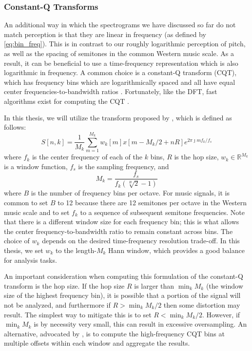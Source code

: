 \subsubsection{Constant-Q Transforms}
\label{sec:cqt}

An additional way in which the spectrograms we have discussed so far do not match perception is that they are linear in frequency (as defined by \cref{eq:bin_freq}).
This is in contrast to our roughly logarithmic perception of pitch, as well as the spacing of semitones in the common Western music scale.
As a result, it can be beneficial to use a time-frequency representation which is also logarithmic in frequency.
A common choice is a constant-Q transform (CQT), which has frequency bins which are logarithmically spaced and all have equal center frequencies-to-bandwidth ratios \cite{brown1991calculation}.
Fortunately, like the DFT, fast algorithms exist for computing the CQT \cite{brown1992efficient,schorkhuber2010constant}.

In this thesis, we will utilize the transform proposed by \cite{schorkhuber2010constant}, which is defined as follows:
\begin{equation}
        S[n, k] = \frac{1}{M_k} \sum_{m = 1}^{M_k} w_k[m]x[m - M_k/2 + nR] e^{2\pi \jmath m f_k/f_s}
\end{equation}
where $f_k$ is the center frequency of each of the $k$ bins, $R$ is the hop size, $w_k \in \mathbb{R}^{M_k}$ is a window function, $f_s$ is the sampling frequency, and
\begin{equation}
        M_k = \frac{f_s}{f_k (\sqrt[B]{2} - 1)}
\end{equation}
where $B$ is the number of frequency bins per octave.
For music signals, it is common to set $B$ to 12 because there are 12 semitones per octave in the Western music scale and to set $f_k$ to a sequence of subsequent semitone frequencies.
Note that there is a different window size for each frequency bin; this is what allows the center frequency-to-bandwidth ratio to remain constant across bins.
The choice of $w_k$ depends on the desired time-frequency resolution trade-off.
In this thesis, we set $w_k$ to the length-$M_k$ Hann window, which provides a good balance for analysis tasks.

An important consideration when computing this formulation of the constant-Q transform is the hop size.
If the hop size $R$ is larger than $\min_k M_k$ (the window size of the highest frequency bin), it is possible that a portion of the signal will not be analyzed, and furthermore if $R > \min_k M_k/2$ then some distortion may result.
The simplest way to mitigate this is to set $R < \min_k M_k/2$.
However, if $\min_k M_k$ is by necessity very small, this can result in excessive oversampling.
An alternative, advocated by \cite{schorkhuber2010constant}, is to compute the high-frequency CQT bins at multiple offsets within each window and aggregate the results.

